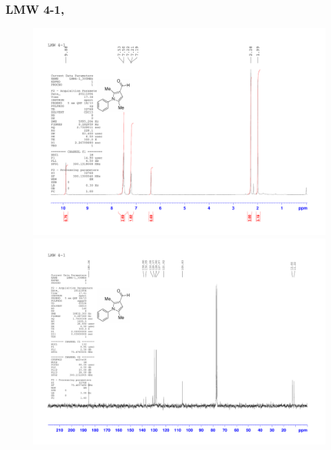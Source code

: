 \documentclass[12pt, a4paper,titlepage]{article}
\begin{document}
{\subsubsection*{LMW 4-1, \pageref{exp:LMW4}}
\label{spec:LMW4}
	\begin{figure}[H] 
	\begin{center}
	\includegraphics[width=14.5cm]{expdata/LMW4/1H}
	\includegraphics[width=14.5cm]{expdata/LMW4/13C}
	\end{center}
	\end{figure}

}
\end{document}
